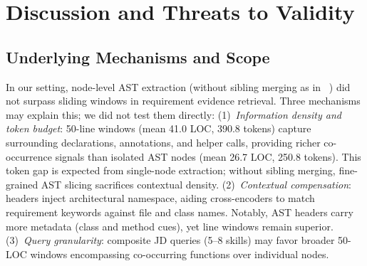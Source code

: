 \section{Discussion and Threats to Validity}
\label{sec:discussion}

\subsection{Underlying Mechanisms and Scope}
In our setting, node-level AST extraction (without sibling merging as in \castname~\cite{zhang2025cast}) did not surpass sliding windows in requirement evidence retrieval. 
Three mechanisms may explain this; we did not test them directly: 
(1)~\textit{Information density and token budget}: 50-line windows (mean 41.0 LOC, 390.8 tokens) capture surrounding declarations, annotations, and helper calls, providing richer co-occurrence signals than isolated AST nodes (mean 26.7 LOC, 250.8 tokens). This token gap is expected from single-node extraction; without sibling merging, fine-grained AST slicing sacrifices contextual density. 
(2)~\textit{Contextual compensation}: headers inject architectural namespace, aiding cross-encoders to match requirement keywords against file and class names. Notably, AST headers carry more metadata (class and method cues), yet line windows remain superior. 
(3)~\textit{Query granularity}: composite JD queries (5--8 skills) may favor broader 50-LOC windows encompassing co-occurring functions over individual nodes.

